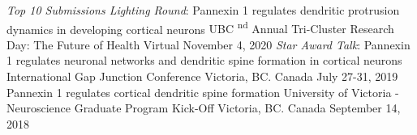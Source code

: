 


\begin{cventries}
  \cventry
  {\textit{Top 10 Submissions Lighting Round}: Pannexin 1 regulates dendritic protrusion dynamics in developing cortical neurons}
  {UBC \textsuperscript{nd} Annual Tri-Cluster Research Day: The Future of Health}
  {Virtual}
  {November 4, 2020}
  \cventry
    {\textit{Star Award Talk}: Pannexin 1 regulates neuronal networks and dendritic spine formation in cortical neurons} %
    {International Gap Junction Conference} %
    {Victoria, BC. Canada} %
    {July 27-31, 2019} %
    {
    }
    \cventry
    {Pannexin 1 regulates cortical dendritic spine formation} %
    {University of Victoria - Neuroscience Graduate Program Kick-Off} %
    {Victoria, BC. Canada} %
    {September 14, 2018} %
   {
}
\end{cventries}
